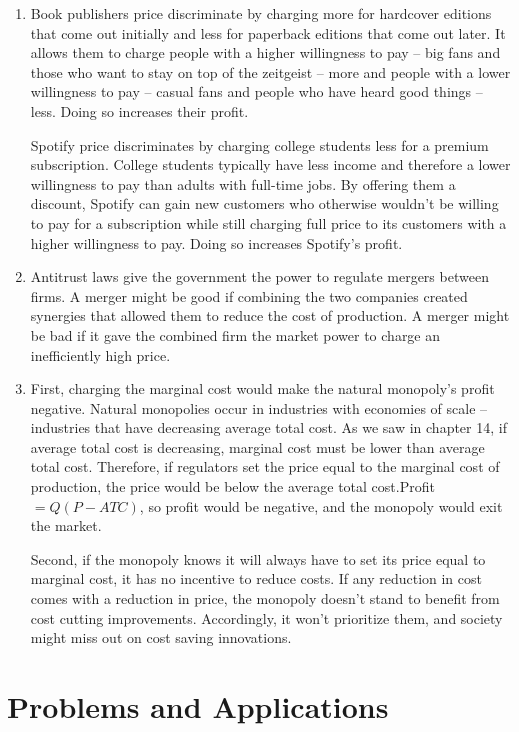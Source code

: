 \documentclass{article}
\begin{document}
\begin{enumerate}
\item Book publishers price discriminate by charging more for hardcover editions that come out initially and less for paperback editions that come out later. It allows them to charge people with a higher willingness to pay -- big fans and those who want to stay on top of the zeitgeist -- more and people with a lower willingness to pay -- casual fans and people who have heard good things -- less. Doing so increases their profit.

Spotify price discriminates by charging college students less for a premium subscription. College students typically have less income and therefore a lower willingness to pay than adults with full-time jobs. By offering them a discount, Spotify can gain new customers who otherwise wouldn't be willing to pay for a subscription while still charging full price to its customers with a higher willingness to pay. Doing so increases Spotify's profit.

\item Antitrust laws give the government the power to regulate mergers between firms. A merger might be good if combining the two companies created synergies that allowed them to reduce the cost of production. A merger might be bad if it gave the combined firm the market power to charge an inefficiently high price.

\item First, charging the marginal cost would make the natural monopoly's profit negative. Natural monopolies occur in industries with economies of scale -- industries that have decreasing average total cost. As we saw in chapter 14, if average total cost is decreasing, marginal cost must be lower than average total cost. Therefore, if regulators set the price equal to the marginal cost of production, the price would be below the average total cost.Profit $= Q(P - ATC)$, so profit would be negative, and the monopoly would exit the market.

Second, if the monopoly knows it will always have to set its price equal to marginal cost, it has no incentive to reduce costs. If any reduction in cost comes with a reduction in price, the monopoly doesn't stand to benefit from cost cutting improvements. Accordingly, it won't prioritize them, and society might miss out on cost saving innovations.  
	
\end{enumerate}

\section*{Problems and Applications}
\end{document}
